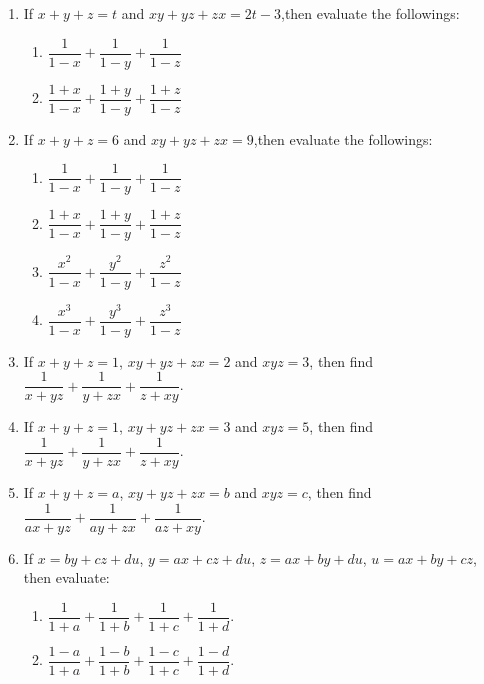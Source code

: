 \begin{enumerate}
            \item If $x+y+z=t$ and $xy+yz+zx=2t-3$,then evaluate the followings:
                \begin{enumerate}[label=(\alph*)]
                    \item $\dfrac{1}{1-x}+\dfrac{1}{1-y}+\dfrac{1}{1-z}$
                    \item $\dfrac{1+x}{1-x}+\dfrac{1+y}{1-y}+\dfrac{1+z}{1-z}$
                \end{enumerate}
            \item If $x+y+z=6$ and $xy+yz+zx=9$,then evaluate the followings:
                \begin{enumerate}[label=(\alph*)]
                    \item $\dfrac{1}{1-x}+\dfrac{1}{1-y}+\dfrac{1}{1-z}$
                    \item $\dfrac{1+x}{1-x}+\dfrac{1+y}{1-y}+\dfrac{1+z}{1-z}$
                    \item $\dfrac{x^2}{1-x}+\dfrac{y^2}{1-y}+\dfrac{z^2}{1-z}$
                    \item $\dfrac{x^3}{1-x}+\dfrac{y^3}{1-y}+\dfrac{z^3}{1-z}$
                \end{enumerate}
            \item If $x+y+z=1$, $xy+yz+zx=2$ and $xyz=3$, then find $\dfrac{1}{x+yz}+\dfrac{1}{y+zx}+\dfrac{1}{z+xy}$.  
            \item If $x+y+z=1$, $xy+yz+zx=3$ and $xyz=5$, then find $\dfrac{1}{x+yz}+\dfrac{1}{y+zx}+\dfrac{1}{z+xy}$.  
            \item If $x+y+z=a$, $xy+yz+zx=b$ and $xyz=c$, then find $\dfrac{1}{ax+yz}+\dfrac{1}{ay+zx}+\dfrac{1}{az+xy}$.  
            










            \item If $x=by+cz+du$, $y=ax+cz+du$, $z=ax+by+du$, $u=ax+by+cz$, then evaluate:
                \begin{enumerate}[label=(\alph*)]
                    \item $\dfrac{1}{1+a}+\dfrac{1}{1+b}+\dfrac{1}{1+c}+\dfrac{1}{1+d}$.
                    \item $\dfrac{1-a}{1+a}+\dfrac{1-b}{1+b}+\dfrac{1-c}{1+c}+\dfrac{1-d}{1+d}$.
                \end{enumerate}
            

\end{enumerate}
